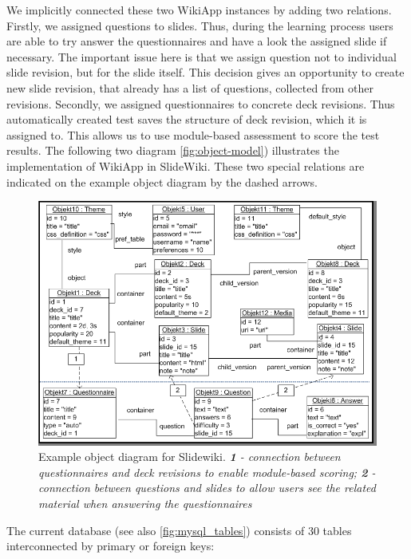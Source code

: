 \documentclass[ngerman,UKenglish,table]{scrbook}
\begin{document}
We implicitly connected these two WikiApp instances by adding two relations.
Firstly, we assigned questions to slides.
Thus, during the learning process users are able to try answer the questionnaires and have a look the assigned slide if necessary.
The important issue here is that we assign question not to individual slide revision, but for the slide itself.
This decision gives an opportunity to create new slide revision, that already has a list of questions, collected from other revisions.
Secondly, we assigned questionnaires to concrete deck revisions.
Thus automatically created test saves the structure of deck revision, which it is assigned to.
This allows us to use module-based assessment to score the test results.
The following two diagram \autoref{fig:object-model}) illustrates the implementation of WikiApp in SlideWiki.
These two special relations are indicated on the example object diagram by the dashed arrows.

\begin{figure}[htb]
	\centering
		\includegraphics[width=\columnwidth]{images/object_diagramm.png}
	\caption{Example object diagram for Slidewiki. \textit{\textbf{1} - connection between questionnaires and deck revisions to enable module-based scoring; \textbf{2} - connection between questions and slides to allow users see the related material when answering the questionnaires}}
	\label{fig:object-model}
\end{figure}


The current database (see also \autoref{fig:mysql_tables}) consists of 30 tables interconnected by primary or foreign keys:
\end{document}
